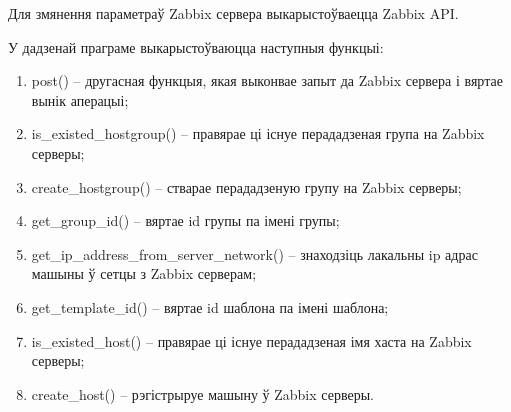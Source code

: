 

Для змянення параметраў Zabbix сервера выкарыстоўваецца Zabbix API.

У дадзенай праграме выкарыстоўваюцца наступныя функцыі:
\begin{enumerate}
    \item post() -- другасная функцыя, якая выконвае запыт да Zabbix сервера і вяртае вынік аперацыі;
    \item is\_existed\_hostgroup() -- правярае ці існуе перададзеная група на Zabbix серверы;
    \item create\_hostgroup() -- стварае перададзеную групу на Zabbix серверы;
    \item get\_group\_id() --  вяртае id групы па імені групы;
    \item get\_ip\_address\_from\_server\_network() -- знаходзіць лакальны ip адрас машыны ў сетцы з Zabbix серверам;
    \item get\_template\_id() --  вяртае id шаблона па імені шаблона;
    \item is\_existed\_host() -- правярае ці існуе перададзеная імя хаста на Zabbix серверы;
    \item create\_host() -- рэгістрыруе машыну ў Zabbix серверы.
\end{enumerate}
